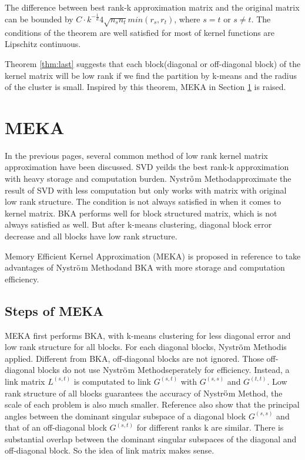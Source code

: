 \documentclass[12pt, a4paper, oneside]{article}
\newcommand{\nysm}{Nystr$\ddot{\rm o}$m Method}
\begin{document}
The difference between best rank-k approximation matrix and the original matrix can be bounded by $C \cdot k^{-\frac{1}{d}} 4 \sqrt{n_{s} n_{t}} min(r_{s}, r_{t})$, where $s = t$ or $s \neq t$. The conditions of the theorem are well satisfied for most of kernel functions are Lipschitz continuous.

Theorem \ref{thm:last} suggests that each block(diagonal or off-diagonal block) of the kernel matrix will be low rank if we find the partition by k-means and the radius of the cluster is small. Inspired by this theorem, MEKA in Section \ref{sec:meka} is raised.


\section{MEKA} %
\label{sec:meka}

In the previous pages, several common method of low rank kernel matrix approximation have been discussed. SVD yeilds the best rank-k approximation with heavy storage and computation burden. \nysm approximate the result of SVD with less computation but only works with matrix with original low rank structure. The condition is not always satisfied in when it comes to kernel matrix. BKA performs well for block structured matrix, which is not always satisfied as well. But after k-means clustering, diagonal block error decrease and all blocks have low rank structure.

Memory Efficient Kernel Approximation (MEKA) is proposed in reference \cite{meka} to take advantages of \nysm and BKA with more storage and computation efficiency.

\subsection{Steps of MEKA}
\label{subsec:smeka}

MEKA first performs BKA, with k-means clustering for less diagonal error and low rank structure for all blocks. For each diagonal blocks, \nysm is applied. Different from BKA, off-diagonal blocks are not ignored. Those off-diagonal blocks do not use \nysm seperately for efficiency. Instead, a link matrix $L^{(s,t)}$ is computated to link $G^{(s,t)}$ with $G^{(s,s)}$ and $G^{(t,t)}$. Low rank structure of all blocks guarantees the accuracy of \nysm, the scale of each problem is also much smaller. Reference \cite{meka} also show that the principal angles between the dominant singular subspace of a
diagonal block $G^{(s,s)}$ and that of an off-diagonal block $G^{(s,t)}$ for different ranks k are similar. There is substantial overlap between the dominant singular subspaces of the diagonal and off-diagonal block. So the idea of link matrix makes sense.
\end{document}
